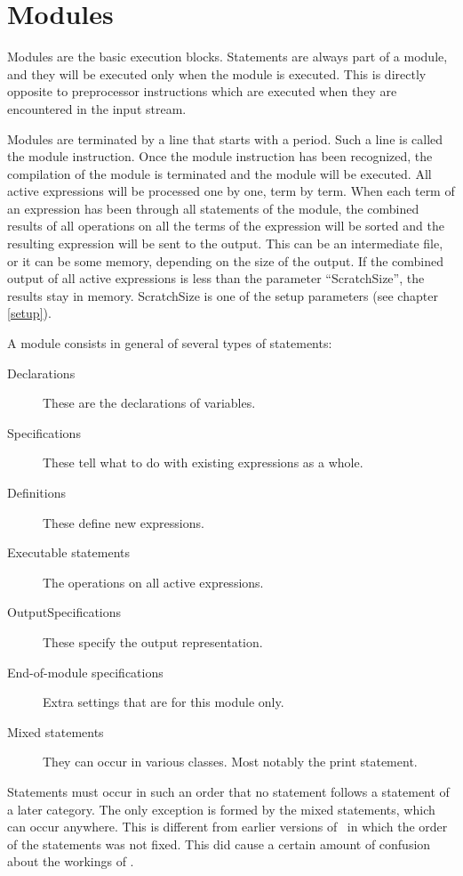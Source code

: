 
\chapter{Modules}
\label{modules}

Modules are the basic execution blocks. 
Statements are always part of a module, and they will be 
executed only when the module is executed. This is directly opposite to 
preprocessor instructions which are executed when they are encountered in 
the input stream.

Modules are terminated by a line that starts with a period. 
Such a line is called the module instruction. 
Once the module instruction has been recognized, the compilation of the 
module is terminated and the module will be executed. All active 
expressions will be processed one by one, term by term. When each term of 
an expression has been through all statements of the module, the combined 
results of all operations on all the terms of the expression will be sorted 
and the resulting expression will be sent to the output. This can be an 
intermediate file, or it can be some 
memory, depending on the size of the output. If the combined 
output of all active expressions is less than the parameter 
``ScratchSize'', the results stay in memory. ScratchSize 
is one of the setup parameters (see chapter \ref{setup}).

A module consists in general of several types of statements:
\begin{description}
\item [Declarations] These are the declarations of 
variables.
\item [Specifications] These tell what to do with 
existing expressions as a whole.
\item [Definitions] These define new expressions.
\item [Executable statements] The operations 
on all active expressions.
\item [OutputSpecifications] These specify the 
output representation.
\item [End-of-module specifications] 
Extra settings that are for this module only.
\item [Mixed statements] They can occur in various 
classes. Most notably the print statement.
\end{description}
Statements must occur in such an order that no statement follows a 
statement of a later category. The only exception is formed by the mixed 
statements, which can occur anywhere. This is different from earlier 
versions of \FORM\ in which the order of the statements was not fixed. This 
did cause a certain amount of confusion about the workings of \FORM\@.

